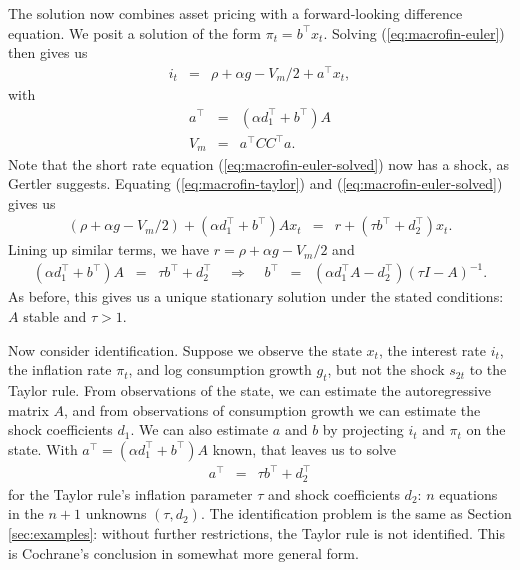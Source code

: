 \documentclass[11pt]{article}
\newcounter{tab}
\begin{document}
{The solution now combines asset pricing with a forward-looking difference equation.
We posit a solution of the form $\pi_t = b^\top x_t$.
Solving (\ref{eq:macrofin-euler}) then gives us
\begin{eqnarray}
    i_t   &=&  \rho+\alpha g - V_m/2  + a^\top x_t ,
    \label{eq:macrofin-euler-solved}
\end{eqnarray}
with
\begin{eqnarray*}
    a^\top &=& (\alpha d_1^\top + b^\top)  A  \\
    V_m     &=& a^\top C C^\top a .
\end{eqnarray*}
Note that the short rate equation (\ref{eq:macrofin-euler-solved}) now has a shock,
as Gertler suggests.
Equating (\ref{eq:macrofin-taylor}) and (\ref{eq:macrofin-euler-solved}) gives us
\begin{eqnarray*}
    \left(\rho+\alpha g - V_m/2\right)
    + (\alpha d_1^\top + b^\top)  A  x_t
    &=&
    r + (\tau b^\top + d_2^\top ) x_t.
\end{eqnarray*}
Lining up similar terms, we have
$   r   = \rho + \alpha g - V_m/ 2 $ and
\begin{eqnarray*}
    (\alpha d_1^\top + b^\top)  A
        \;\;=\;\;  \tau b^\top + d_2^\top
        \;\;\;\;\Rightarrow \;\;\;\;
        b^\top \;\;=\;\; (\alpha d_1^\top A - d_2^\top) (\tau I -  A )^{-1} .
\end{eqnarray*}
As before, this gives us a unique stationary solution
under the stated conditions:  $ A $ stable and $\tau>1$.


Now consider identification.
Suppose we observe the state $x_t$, the interest rate $i_t$,
the inflation rate $\pi_t$, and log consumption growth $g_t$,
but not the shock $s_{2t}$ to the Taylor rule.
From observations of the state,
we can estimate the autoregressive matrix $ A $,
and from observations of consumption growth we can estimate
the shock coefficients $d_1$.
We can also estimate $a$ and $b$ by projecting
$i_t$ and $\pi_t$ on the state.
With $a^\top = (\alpha d_1^\top + b^\top)  A $ known, that leaves us to solve
\begin{eqnarray}
    a^\top
        &=&  \tau b^\top + d_2^\top
        \label{eq:macrofin-solution-2}
\end{eqnarray}
for the Taylor rule's inflation parameter $\tau$  and shock coefficients $d_2$:
$n$ equations in the $n+1$ unknowns $(\tau,d_2)$.
The identification problem is the same as Section \ref{sec:examples}:
without further restrictions,
the Taylor rule is not identified.
This is Cochrane's conclusion in somewhat more general form.

}
\end{document}
